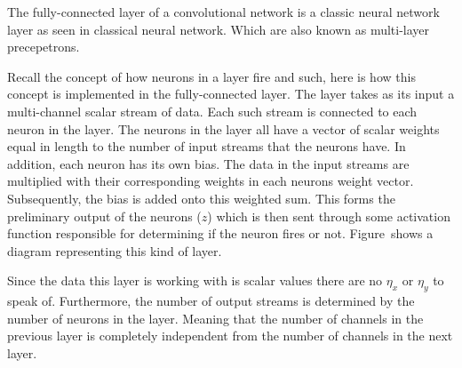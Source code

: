 The fully-connected layer of a convolutional network is a classic neural network layer as seen in classical neural network.
Which are also known as multi-layer precepetrons.

Recall the concept of how neurons in a layer fire and such, here is how this concept is implemented in the fully-connected layer.
The layer takes as its input a multi-channel scalar stream of data.
Each such stream is connected to each neuron in the layer.
The neurons in the layer all have a vector of scalar weights equal in length to the number of input streams that the neurons have.
In addition, each neuron has its own bias.
The data in the input streams are multiplied with their corresponding weights in each neurons weight vector.
Subsequently, the bias is added onto this weighted sum.
This forms the preliminary output of the neurons ($z$) which is then sent through some activation function responsible for determining if the neuron fires or not.
Figure~\in[fc-handdraw] shows a diagram representing this kind of layer.

\startplacefigure[
    reference=fc-handdraw,
    location=bottom,
    title={A diagram of a fully-connected layer.},
]
\stopplacefigure

Since the data this layer is working with is scalar values there are no $\eta_x$ or $\eta_y$ to speak of.
Furthermore, the number of output streams is determined by the number of neurons in the layer.
Meaning that the number of channels in the previous layer is completely independent from the number of channels in the next layer.

